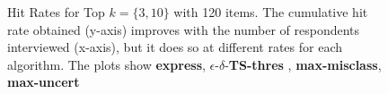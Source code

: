 \documentclass[a4paper,12pt]{article}
\newcommand{\eric}[1]{\textcolor{red}{\textbf{(eric)} #1}}
\newcommand{\fixedexpress}{\textbf{express}}
\newcommand{\mismin}{\textbf{max-misclass}}
\newcommand{\edtsthres}{$\epsilon$-$\delta$-\textbf{TS-thres} }
\newcommand{\uncert}{\textbf{max-uncert} }
\begin{document}
\begin{figure}%
    \caption{Hit Rates for Top $k=\{3,10\}$ with 120 items. The cumulative hit rate obtained (y-axis) improves with the number of respondents interviewed (x-axis), but it does so at different rates for each algorithm. The plots show \fixedexpress, \edtsthres, \mismin, \uncert }%
    \label{fig:K120_L20_k3hit_k10hit}%
 	\begin{center}
    \qquad
	\end{center}
\end{figure}

\end{document}
